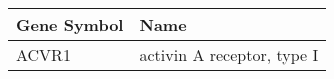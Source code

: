 \begin{tabular}{ll}
\toprule
Gene Symbol &                       Name \\
\midrule
      ACVR1 & activin A receptor, type I \\
\bottomrule
\end{tabular}
